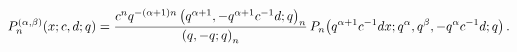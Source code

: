 \[\mathop{P^{(\alpha,\beta)}_{n}\/}\nolimits\!\left(x;c,d;q\right)=\frac{c^{n}q^%
{-(\alpha+1)n}\left(q^{\alpha+1},-q^{\alpha+1}c^{-1}d;q\right)_{n}}{\left(q,-q%
;q\right)_{n}}\*\mathop{P_{n}\/}\nolimits\!\left(q^{\alpha+1}c^{-1}dx;q^{%
\alpha},q^{\beta},-q^{\alpha}c^{-1}d;q\right).\]